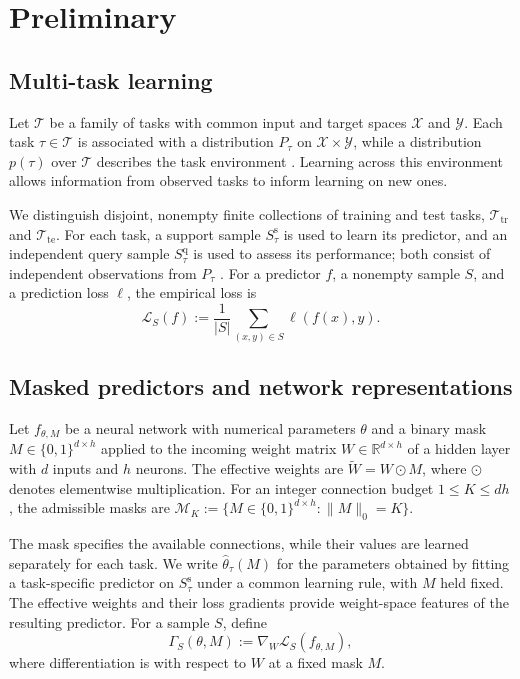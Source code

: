 \section{Preliminary}
\label{sec:preliminary}

\subsection{Multi-task learning}
\label{sec:tasks}

Let $\mathcal{T}$ be a family of tasks with common input and target spaces
$\mathcal{X}$ and $\mathcal{Y}$. Each task $\tau\in\mathcal{T}$ is associated
with a distribution $P_\tau$ on $\mathcal{X}\times\mathcal{Y}$, while
a distribution $p(\tau)$ over $\mathcal{T}$ describes the task environment
\cite{baxter2000model}.
Learning across this environment allows information from observed tasks
to inform learning on new ones.

We distinguish disjoint, nonempty finite collections of training and test tasks,
$\mathcal{T}_{\mathrm{tr}}$ and $\mathcal{T}_{\mathrm{te}}$.
For each task, a support sample $S_\tau^{\mathrm{s}}$ is used to learn
its predictor, and an independent query sample $S_\tau^{\mathrm{q}}$
is used to assess its performance; both consist of independent
observations from $P_\tau$ \cite{finn2017model,zhou2021meta}.
For a predictor $f$, a nonempty sample $S$, and a prediction loss $\ell$,
the empirical loss is
\begin{equation}
    \mathcal{L}_S(f)
    :=\frac{1}{|S|}\sum_{(x,y)\in S}\ell(f(x),y).
    \label{eq:task-loss}
\end{equation}

\subsection{Masked predictors and network representations}
\label{sec:masked-predictors}

Let $f_{\theta,M}$ be a neural network with numerical parameters $\theta$
and a binary mask $M\in\{0,1\}^{d\times h}$ applied to the incoming weight
matrix $W\in\mathbb{R}^{d\times h}$ of a hidden layer with $d$ inputs
and $h$ neurons. The effective weights are
$\widetilde W=W\odot M$, where $\odot$ denotes elementwise multiplication.
For an integer connection budget $1\le K\le dh$, the admissible masks are
$\mathcal{M}_K:=\{M\in\{0,1\}^{d\times h}:\|M\|_0=K\}$.

The mask specifies the available connections, while their values are
learned separately for each task. We write $\widehat\theta_\tau(M)$ for
the parameters obtained by fitting a task-specific predictor on
$S_\tau^{\mathrm{s}}$ under a common learning rule, with $M$ held fixed.
The effective weights and their loss gradients provide weight-space
features of the resulting predictor. For a sample $S$, define
\begin{equation}
    \Gamma_S(\theta,M):=\nabla_W\mathcal{L}_S(f_{\theta,M}),
    \label{eq:weight-gradient}
\end{equation}
where differentiation is with respect to $W$ at a fixed mask $M$.

